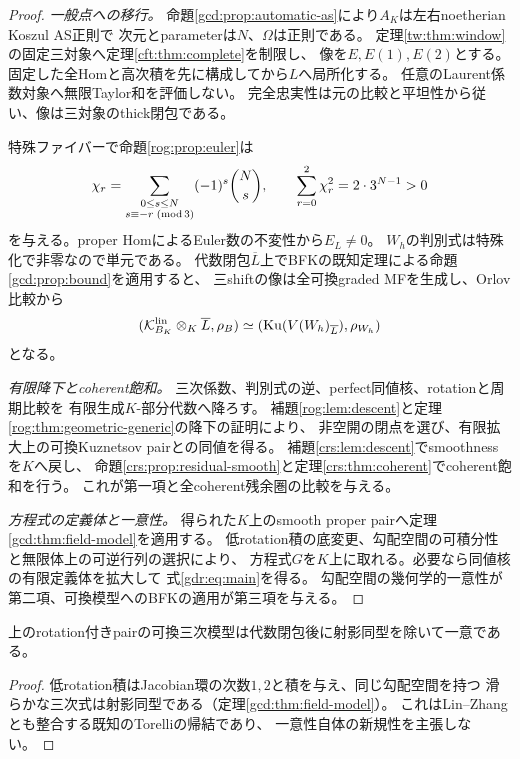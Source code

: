 \begin{proof}
\emph{一般点への移行。}
命題\ref{gcd:prop:automatic-as}により$A_K$は左右noetherian Koszul AS正則で
次元とparameterは$N$、$\Omega$は正則である。
定理\ref{tw:thm:window}の固定三対象へ定理\ref{cft:thm:complete}を制限し、
像を$E,E(1),E(2)$とする。固定した全Homと高次積を先に構成してから$L$へ局所化する。
任意のLaurent係数対象へ無限Taylor和を評価しない。
完全忠実性は元の比較と平坦性から従い、像は三対象のthick閉包である。

特殊ファイバーで命題\ref{rog:prop:euler}は
\begin{equation}\label{gdr:eq:euler}
 \chi_r=\sum_{\substack{0\le s\le N\\s\equiv-r\;({\rm mod}\,3)}}
 (-1)^s\binom Ns,\qquad \sum_{r=0}^2\chi_r^2=2\cdot3^{N-1}>0
\end{equation}
を与える。proper HomによるEuler数の不変性から$E_L\ne0$。
$W_h$の判別式は特殊化で非零なので単元である。
代数閉包$\overline L$上でBFKの既知定理による命題\ref{gcd:prop:bound}を適用すると、
三shiftの像は全可換graded MFを生成し、Orlov比較から
\begin{equation}\label{gdr:eq:laurent}
 (\mathcal K^{\rm lin}_{B_K}\otimes_K\overline L,\rho_B)
 \simeq(\operatorname{Ku}(V(W_h)_{\overline L}),\rho_{W_h})
\end{equation}
となる。

\emph{有限降下とcoherent飽和。}
三次係数、判別式の逆、perfect同値核、rotationと周期比較を
有限生成$K$-部分代数へ降ろす。
補題\ref{rog:lem:descent}と定理\ref{rog:thm:geometric-generic}の降下の証明により、
非空開の閉点を選び、有限拡大上の可換Kuznetsov pairとの同値を得る。
補題\ref{crs:lem:descent}でsmoothnessを$K$へ戻し、
命題\ref{crs:prop:residual-smooth}と定理\ref{crs:thm:coherent}でcoherent飽和を行う。
これが第一項と全coherent残余圏の比較を与える。

\emph{方程式の定義体と一意性。}
得られた$K$上のsmooth proper pairへ定理\ref{gcd:thm:field-model}を適用する。
低rotation積の底変更、勾配空間の可積分性と無限体上の可逆行列の選択により、
方程式$G$を$K$上に取れる。必要なら同値核の有限定義体を拡大して
式\eqref{gdr:eq:main}を得る。
勾配空間の幾何学的一意性が第二項、可換模型へのBFKの適用が第三項を与える。
\end{proof}

\begin{corollary}
\label{gdr:cor:uniqueness}
上のrotation付きpairの可換三次模型は代数閉包後に射影同型を除いて一意である。
\end{corollary}
\begin{proof}
低rotation積はJacobian環の次数$1,2$と積を与え、同じ勾配空間を持つ
滑らかな三次式は射影同型である（定理\ref{gcd:thm:field-model}）。
これはLin--Zhang\cite[Theorem~1.7, Section~5]{LZ}とも整合する既知のTorelliの帰結であり、
一意性自体の新規性を主張しない。
\end{proof}

